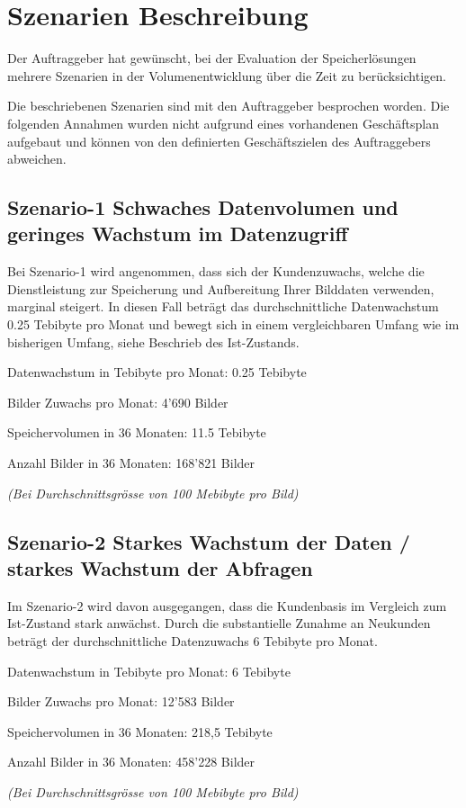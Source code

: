 
\cleardoublepage
\chapter{Szenarien Beschreibung}
Der Auftraggeber hat gewünscht, bei der Evaluation der Speicherlösungen mehrere Szenarien in der Volumenentwicklung über die Zeit zu berücksichtigen. 

Die beschriebenen Szenarien sind mit den Auftraggeber besprochen worden. Die folgenden Annahmen wurden nicht aufgrund eines vorhandenen Geschäftsplan aufgebaut und können von den definierten Geschäftszielen des Auftraggebers abweichen. 


\section{Szenario-1 Schwaches Datenvolumen und geringes Wachstum im Datenzugriff}%
Bei Szenario-1 wird angenommen, dass sich der Kundenzuwachs, welche die Dienstleistung zur Speicherung und Aufbereitung Ihrer Bilddaten verwenden, marginal steigert. In diesen Fall beträgt das durchschnittliche Datenwachstum 0.25 Tebibyte pro Monat und bewegt sich in einem vergleichbaren Umfang wie im bisherigen Umfang, siehe Beschrieb des Ist-Zustands.


Datenwachstum in Tebibyte pro Monat: 0.25 Tebibyte

Bilder Zuwachs pro Monat: 4'690 Bilder 

Speichervolumen in 36 Monaten: 11.5 Tebibyte

Anzahl Bilder in 36 Monaten: 168'821 Bilder

\textit{(Bei Durchschnittsgrösse von 100 Mebibyte pro Bild)}

\section{Szenario-2 Starkes Wachstum der Daten / starkes Wachstum der Abfragen}
Im Szenario-2 wird davon ausgegangen, dass die Kundenbasis im Vergleich zum Ist-Zustand stark anwächst. Durch die substantielle Zunahme an Neukunden beträgt der durchschnittliche Datenzuwachs 6 Tebibyte pro Monat.


Datenwachstum in Tebibyte pro Monat: 6 Tebibyte

Bilder Zuwachs pro Monat: 12'583 Bilder

Speichervolumen in 36 Monaten: 218,5 Tebibyte

Anzahl Bilder in 36 Monaten: 458'228 Bilder

\textit{(Bei Durchschnittsgrösse von 100 Mebibyte pro Bild)}
 
